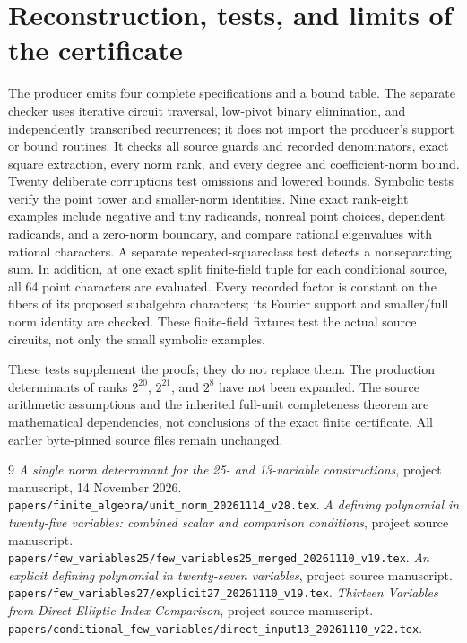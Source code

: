 \documentclass[11pt,a4paper]{article}
\theoremstyle{remark}\newtheorem{remark}[theorem]{Remark}
\begin{document}
\section{Reconstruction, tests, and limits of the certificate}
The producer emits four complete specifications and a bound table.
The separate checker uses iterative circuit traversal, low-pivot binary
elimination, and independently transcribed recurrences; it does not
import the producer's support or bound routines. It checks all source
guards and recorded denominators, exact square extraction, every norm
rank, and every degree and coefficient-norm bound. Twenty deliberate
corruptions test omissions and lowered bounds. Symbolic tests verify the
point tower and smaller-norm identities. Nine exact rank-eight examples
include negative and tiny radicands, nonreal point choices, dependent
radicands, and a zero-norm boundary, and compare rational eigenvalues
with rational characters. A separate repeated-squareclass test detects
a nonseparating sum. In addition, at one exact split finite-field tuple
for each conditional source, all 64 point characters are evaluated. Every
recorded factor is constant on the fibers of its proposed subalgebra
characters; its Fourier support and smaller/full norm identity are checked.
These finite-field fixtures test the actual source circuits, not only
the small symbolic examples.

These tests supplement the proofs; they do not replace them. The
production determinants of ranks $2^{20}$, $2^{21}$, and $2^8$ have not
been expanded. The source arithmetic assumptions and the inherited
full-unit completeness theorem are mathematical dependencies, not
conclusions of the exact finite certificate. All earlier byte-pinned
source files remain unchanged.

\begin{thebibliography}{9}
 \emph{A single norm determinant for the 25- and
13-variable constructions}, project manuscript, 14 November 2026.
\nolinkurl{papers/finite_algebra/unit_norm_20261114_v28.tex}.
 \emph{A defining polynomial in twenty-five variables:
combined scalar and comparison conditions}, project source manuscript.
\nolinkurl{papers/few_variables25/few_variables25_merged_20261110_v19.tex}.
 \emph{An explicit defining polynomial in twenty-seven
variables}, project source manuscript.
\nolinkurl{papers/few_variables27/explicit27_20261110_v19.tex}.
 \emph{Thirteen Variables from Direct Elliptic Index
Comparison}, project source manuscript.
\nolinkurl{papers/conditional_few_variables/direct_input13_20261110_v22.tex}.
\end{thebibliography}
\end{document}
